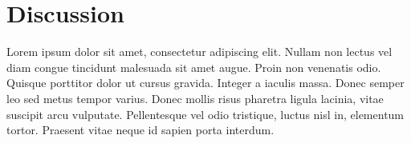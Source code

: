 \documentclass[a0,landscape]{a0poster}
\newcommand{\secmoveup}{\vspace{-1cm}}
\begin{document}
\begin{multicols}{3}
\begin{center}
\end{center}

\secmoveup
\section{Discussion}
Lorem ipsum dolor sit amet, consectetur adipiscing elit. Nullam non lectus vel diam congue tincidunt malesuada sit amet augue. Proin non venenatis odio. Quisque porttitor dolor ut cursus gravida. Integer a iaculis massa. Donec semper leo sed metus tempor varius. Donec mollis risus pharetra ligula lacinia, vitae suscipit arcu vulputate. Pellentesque vel odio tristique, luctus nisl in, elementum tortor. Praesent vitae neque id sapien porta interdum.




\end{multicols}
\end{document}
